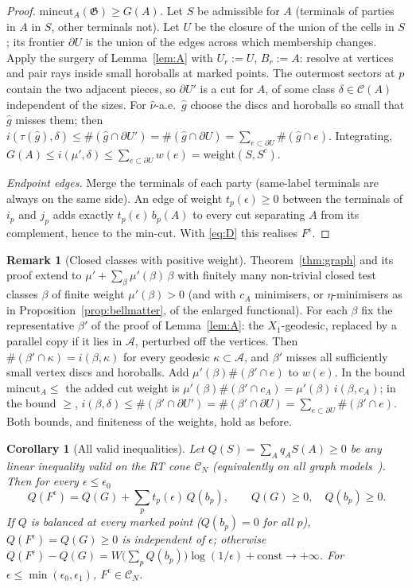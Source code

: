 \documentclass[aps,prd,onecolumn,superscriptaddress,nofootinbib,amsmath,amssymb,11pt]{revtex4-2}
\newtheorem{corollary}[theorem]{Corollary}
\theoremstyle{definition}
\newtheorem{remark}[theorem]{Remark}
\newcommand{\Cut}{\mathcal{C}}
\newcommand{\CN}{\mathcal{C}_N}
\newcommand{\eps}{\epsilon}
\begin{document}
\begin{proof}
\emph{$\mathrm{mincut}_A(\mathfrak G)\ge G(A)$.} Let $S$ be admissible for $A$ (terminals of parties in $A$ in $S$, other
terminals not). Let $U$ be the closure of the union of the cells in $S$; its frontier $\partial U$ is the union of the
edges across which membership changes. Apply the surgery of Lemma~\ref{lem:A} with $U_r:=U$, $B_r:=A$: resolve at
vertices and pair rays inside small horoballs at marked points. The outermost sectors at $p$ contain the two adjacent
pieces, so $\partial U'$ is a cut for $A$, of some class $\delta\in\Cut(A)$ independent of the sizes. For
$\hat\nu$-a.e.\ $\hat g$ choose the discs and horoballs so small that $\hat g$ misses them; then
$i(\tau(\hat g),\delta)\le\#(\hat g\cap\partial U')=\#(\hat g\cap\partial U)=\sum_{e\subset\partial U}\#(\hat g\cap e)$.
Integrating, $G(A)\le i(\mu',\delta)\le\sum_{e\subset\partial U}w(e)=\mathrm{weight}(S,S^c)$.

\emph{Endpoint edges.} Merge the terminals of each party (same-label terminals are always on the same side). An
edge of weight $t_p(\eps)\ge0$ between the terminals of $i_p$ and $j_p$ adds exactly $t_p(\eps)\,b_p(A)$ to every cut
separating $A$ from its complement, hence to the min-cut. With \eqref{eq:D} this realises $F^\eps$.
\end{proof}

\begin{remark}[Closed classes with positive weight]\label{rem:closedw}
Theorem~\ref{thm:graph} and its proof extend to $\mu'+\sum_\beta\mu'(\beta)\,\beta$ with finitely many non-trivial closed test classes
$\beta$ of finite weight $\mu'(\beta)>0$ (and with $c_A$ minimisers, or $\eta$-minimisers as in Proposition~\ref{prop:bellmatter}, of the
enlarged functional). For each $\beta$ fix the representative $\beta'$ of the proof of Lemma~\ref{lem:A}: the $X_1$-geodesic,
replaced by a parallel copy if it lies in $\mathcal A$, perturbed off the vertices. Then $\#(\beta'\cap\kappa)=i(\beta,\kappa)$ for every
geodesic $\kappa\subset\mathcal A$, and $\beta'$ misses all sufficiently small vertex discs and horoballs. Add $\mu'(\beta)\#(\beta'\cap e)$ to
$w(e)$. In the bound $\mathrm{mincut}_A\le$ the added cut weight is $\mu'(\beta)\#(\beta'\cap c_A)=\mu'(\beta)\,i(\beta,c_A)$; in the bound
$\ge$, $i(\beta,\delta)\le\#(\beta'\cap\partial U')=\#(\beta'\cap\partial U)=\sum_{e\subset\partial U}\#(\beta'\cap e)$. Both bounds, and
finiteness of the weights, hold as before.
\end{remark}

\begin{corollary}[All valid inequalities]\label{cor:cone}
Let $Q(S)=\sum_Aq_AS(A)\ge0$ be any linear inequality valid on the RT cone $\CN$ (equivalently on all graph
models~\cite{Bao2015}). Then for every $\eps\le\eps_0$
\[
Q(F^\eps)=Q(G)+\sum_pt_p(\eps)\,Q(b_p),\qquad Q(G)\ge0,\quad Q(b_p)\ge0 .
\]
If $Q$ is balanced at every marked point ($Q(b_p)=0$ for all $p$), $Q(F^\eps)=Q(G)\ge0$ is independent of $\eps$;
otherwise $Q(F^\eps)-Q(G)=W\big(\sum_pQ(b_p)\big)\log(1/\eps)+\mathrm{const}\to+\infty$. For $\eps\le\min(\eps_0,\eps_1)$,
$F^\eps\in\CN$.
\end{corollary}
\end{document}
